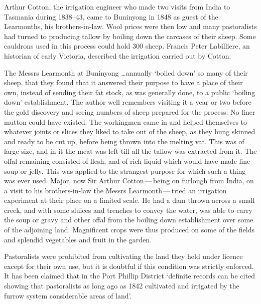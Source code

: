 Arthur Cotton,  the irrigation engineer who made two
visits from India to Tasmania during 1838--43, came to Buninyong in
1848 as guest of the Learmonths, his brothers-in-law.  Wool
 prices were then low and many pastoralists had turned to
producing tallow  by boiling down the carcases of their
sheep.  Some cauldrons used in this process could hold 300
sheep.  Francis Peter Labilliere,
 an
historian of early Victoria, described the irrigation carried out by
Cotton:
\begin{Quote}
	The Messrs Learmonth at Buninyong \ldots annually `boiled
	down' so many of their sheep, that they found that it answered
	their purpose to have a place of their own, instead of sending
	their fat stock, as was generally done, to a public `boiling
	down' establishment.  The author well remembers visiting it a
	year or two before the gold discovery and seeing numbers of
	sheep prepared for the process.  No finer mutton could have
	existed.  The workingmen came in and helped themselves to
	whatever joints or slices they liked to take out of the sheep,
	as they hung skinned and ready to be cut up, before being
	thrown into the melting vat.  This was of large size, and in
	it the meat was left till all the tallow was extracted from
	it.  The offal remaining consisted of flesh, and of rich
	liquid which would have made fine soup or jelly.  This was
	applied to the strangest purpose for which such a thing was
	ever used.  Major, now Sir Arthur Cotton\,---\,being on
	furlough from India, on a visit to his brothers-in-law the
	Messrs Learmonth\,---\,tried an irrigation experiment at their
	place on a limited scale.  He had a dam thrown across a small
	creek, and with some sluices and trenches to convey the water,
	was able to carry the soup or gravy and other offal from the
	boiling down establishment over some of the adjoining land.
	Magnificent crops were thus produced on some of the fields and
	splendid vegetables and fruit in the
	garden.
\end{Quote}

Pastoralists were prohibited from cultivating the land they held under
licence except for their own use, but it is doubtful if this condition
was strictly enforced.  It has been claimed that in the Port Phillip
District `definite records can be cited showing that pastoralists as
long ago as 1842 cultivated and irrigated by the furrow system
considerable areas of land'.

